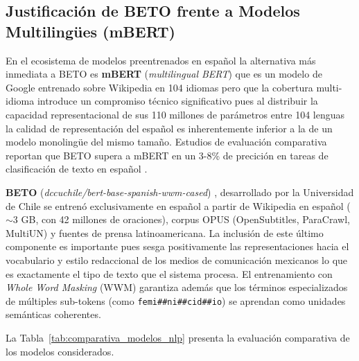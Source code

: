 \subsection{Justificación de BETO frente a Modelos Multilingües (mBERT)}
\label{subsec:ea_beto_vs_mbert}

En el ecosistema de modelos preentrenados en español la alternativa más inmediata
a BETO es \textbf{mBERT} (\textit{multilingual BERT}) que es un modelo de Google entrenado
sobre Wikipedia en 104 idiomas pero que la cobertura multi-idioma introduce
un compromiso técnico significativo pues al distribuir la capacidad representacional de
sus 110 millones de parámetros entre 104 lenguas la calidad de representación del
español es inherentemente inferior a la de un modelo monolingüe del mismo tamaño.
Estudios de evaluación comparativa reportan que BETO supera a mBERT en un 3-8\%
de precición en tareas de clasificación de texto en español \cite{canete2020beto}.

\textbf{BETO} (\textit{dccuchile/bert-base-spanish-wwm-cased}) \cite{canete2020beto},
desarrollado por la Universidad de Chile se entrenó exclusivamente en español
a partir de Wikipedia en español ($\sim$3 GB, con 42 millones de oraciones), corpus
OPUS (OpenSubtitles, ParaCrawl, MultiUN) y fuentes de prensa latinoamericana.
La inclusión de este último componente es importante pues sesga
positivamente las representaciones hacia el vocabulario y estilo redaccional
de los medios de comunicación mexicanos lo que es exactamente el tipo de texto
que el sistema procesa. El entrenamiento con \textit{Whole Word Masking} (WWM)
garantiza además que los términos especializados de múltiples sub-tokens
(como \texttt{femi\#\#ni\#\#cid\#\#io}) se aprendan como unidades semánticas
coherentes.

La Tabla~\ref{tab:comparativa_modelos_nlp} presenta la evaluación comparativa
de los modelos considerados.

